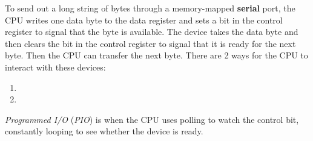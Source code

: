 To send out a long string of bytes through a memory-mapped \textbf{serial} port, the CPU writes one data byte to the data register and sets a bit in the control register to signal that the byte is available.
The device takes the data byte and then clears the bit in the control register to signal that it is ready for the next byte.
Then the CPU can transfer the next byte.
There are 2 ways for the CPU to interact with these devices:
\begin{enumerate}[noitemsep]
\item {}
\item {}
\end{enumerate}

\begin{definition}[Programmed I/O]\label{def:Programmed_IO}
  \emph{Programmed I/O} (\emph{PIO}) is when the CPU uses polling to watch the control bit, constantly looping to see whether the device is ready.
\end{definition}


